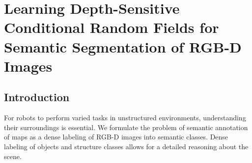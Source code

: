 




\chapter{Learning Depth-Sensitive Conditional Random Fields for Semantic
Segmentation of RGB-D Images}

\section{Introduction}
For robots to perform varied tasks in unstructured environments, understanding their
surroundings is essential. We formulate the problem of semantic annotation of maps
as a dense labeling of RGB-D images into semantic classes. Dense labeling of objects
and structure classes allows for a detailed reasoning about the scene.

